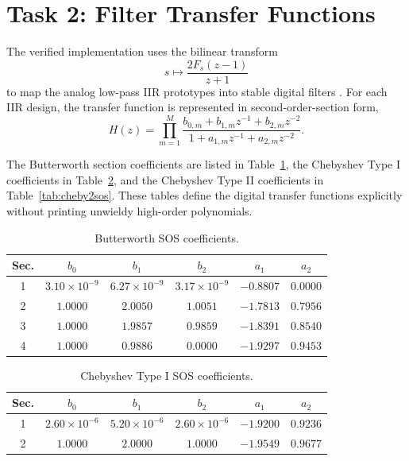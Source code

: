 \documentclass[12pt, a4paper]{article}
\begin{document}
\section{Task 2: Filter Transfer Functions}
The verified implementation uses the bilinear transform
\begin{equation}
s \mapsto \frac{2F_s(z-1)}{z+1}
\end{equation}
to map the analog low-pass IIR prototypes into stable digital filters \cite{oppenheim2010, antoniou2018, rabiner1975}. For each IIR design, the transfer function is represented in second-order-section form,
\begin{equation}
H(z) = \prod_{m=1}^{M} \frac{b_{0,m} + b_{1,m}z^{-1} + b_{2,m}z^{-2}}{1 + a_{1,m}z^{-1} + a_{2,m}z^{-2}}.
\end{equation}

The Butterworth section coefficients are listed in Table~\ref{tab:buttersos}, the Chebyshev Type I coefficients in Table~\ref{tab:cheby1sos}, and the Chebyshev Type II coefficients in Table~\ref{tab:cheby2sos}. These tables define the digital transfer functions explicitly without printing unwieldy high-order polynomials.
\begin{table}[H]
  \centering
  \footnotesize
  \caption{Butterworth SOS coefficients.}
  \label{tab:buttersos}
  \begin{tabular}{cccccc}
    \toprule
    Sec. & $b_0$ & $b_1$ & $b_2$ & $a_1$ & $a_2$ \\
    \midrule
    1 & $3.10\times10^{-9}$ & $6.27\times10^{-9}$ & $3.17\times10^{-9}$ & $-0.8807$ & $0.0000$ \\
    2 & $1.0000$ & $2.0050$ & $1.0051$ & $-1.7813$ & $0.7956$ \\
    3 & $1.0000$ & $1.9857$ & $0.9859$ & $-1.8391$ & $0.8540$ \\
    4 & $1.0000$ & $0.9886$ & $0.0000$ & $-1.9297$ & $0.9453$ \\
    \bottomrule
  \end{tabular}
\end{table}

\begin{table}[H]
  \centering
  \footnotesize
  \caption{Chebyshev Type I SOS coefficients.}
  \label{tab:cheby1sos}
  \begin{tabular}{cccccc}
    \toprule
    Sec. & $b_0$ & $b_1$ & $b_2$ & $a_1$ & $a_2$ \\
    \midrule
    1 & $2.60\times10^{-6}$ & $5.20\times10^{-6}$ & $2.60\times10^{-6}$ & $-1.9200$ & $0.9236$ \\
    2 & $1.0000$ & $2.0000$ & $1.0000$ & $-1.9549$ & $0.9677$ \\
    \bottomrule
  \end{tabular}
\end{table}
\end{document}
